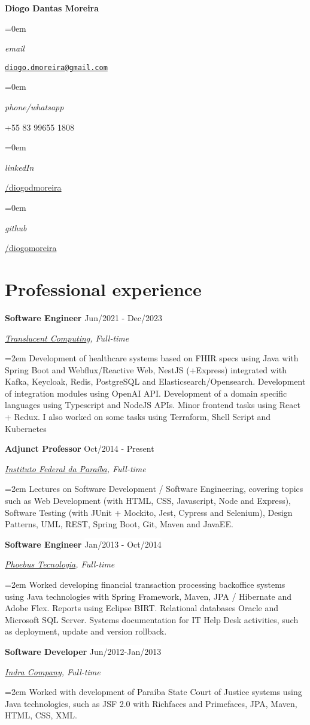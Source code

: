\documentclass[a4paper,10pt]{article}
\newlength{\spacebox}
\newcommand{\Name}[1]{\noindent\huge\textbf{#1}\normalsize\normalfont}
\newcommand{\NewPart}[1]{\section*{\large{\textbf{#1}}}}
\newcommand{\PersonalEntry}[2]{
		\noindent\hangindent=0em\hangafter=0 		%
		\parbox{\spacebox}{							%
		\textit{#1}}								%
		\hspace{4.5em} #2 \par}						%
\newcommand{\EducationEntry}[4]{
		\noindent \textbf{#1} \hfill 					%
		\colorbox{White}{%
			\parbox{6em}{%
			\hfill\color{Black}#2}} \par				%
		\noindent \textit{#3} \par						%
		\noindent \hangindent=0em\hangafter=0 \normalsize #4 	%
		\normalsize \par
		\vspace{0.5em}
	}
\newcommand{\WorkEntry}[4]{								%
		\noindent \textbf{#1} \hfill 					%
		\colorbox{White}{\color{Black}#2} \par			%
		\noindent \textit{#3} \par						%
		\noindent\hangindent=2em\hangafter=0 \normalsize #4 	%
		\normalsize \par
		\vspace{0.5em}
	}
\begin{document}
\Name{Diogo Dantas Moreira}



\begin{multicols}{2}

\PersonalEntry{email}{\texttt{\href{mailto:diogo.dmoreira@gmail.com}{diogo.dmoreira@gmail.com}}}
\PersonalEntry{phone/whatsapp}{+55 83 99655 1808}
\PersonalEntry{linkedIn}{\href{http://br.linkedin.com/in/diogodmoreira/}{/diogodmoreira}}
\PersonalEntry{github}{\href{http://github.com/diogomoreira}{/diogomoreira}}
\end{multicols}

\NewPart{Professional experience}

\WorkEntry{Software Engineer}{Jun/2021 - Dec/2023}{\href{https://www.translucentcomputing.com/}{Translucent Computing}, Full-time}{Development of healthcare systems based on FHIR specs using Java with Spring Boot and Webflux/Reactive Web, NestJS (+Express) integrated with Kafka, Keycloak, Redis, PostgreSQL and Elasticsearch/Opensearch. Development of integration modules using OpenAI API. Development of a domain specific languages using Typescript and NodeJS APIs. Minor frontend tasks using React + Redux. I also worked on some tasks using Terraform, Shell Script and Kubernetes}

\WorkEntry{Adjunct Professor}{Oct/2014 - Present}{\href{https://www.ifpb.edu.br/}{Instituto Federal da Paraíba}, Full-time}{Lectures on Software Development / Software Engineering, covering topics such as Web Development (with HTML, CSS, Javascript, Node and Express), Software Testing (with JUnit + Mockito, Jest, Cypress and Selenium), Design Patterns, UML, REST, Spring Boot, Git, Maven and JavaEE.}

\WorkEntry{Software Engineer}{Jan/2013 - Oct/2014}{\href{http://www.phoebus.com.br/}{Phoebus Tecnologia}, Full-time}{Worked developing financial transaction processing backoffice systems using Java technologies with Spring Framework, Maven, JPA / Hibernate and Adobe Flex. Reports using Eclipse BIRT. Relational databases Oracle and Microsoft SQL Server. Systems documentation for IT Help Desk activities, such as deployment, update and version rollback.}

\WorkEntry{Software Developer}{Jun/2012-Jan/2013}{\href{https://www.indracompany.com/es/pais/brasil}{Indra Company}, Full-time}{Worked with development of Paraíba State Court of Justice systems using Java technologies, such as JSF 2.0 with Richfaces and Primefaces, JPA, Maven, HTML, CSS, XML.}
\end{document}
